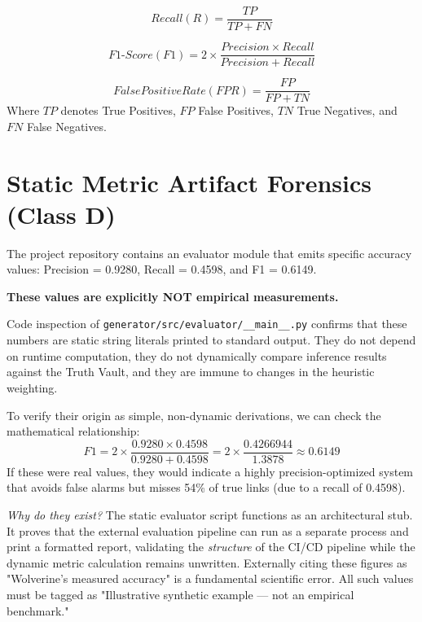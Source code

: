 \begin{equation}
\label{eq:recall}
Recall (R) = \frac{TP}{TP + FN}
\end{equation}

\begin{equation}
\label{eq:f1}
F1\text{-}Score (F1) = 2 \times \frac{Precision \times Recall}{Precision + Recall}
\end{equation}

\begin{equation}
\label{eq:fpr}
False Positive Rate (FPR) = \frac{FP}{FP + TN}
\end{equation}
Where $TP$ denotes True Positives, $FP$ False Positives, $TN$ True Negatives, and $FN$ False Negatives.

\section{Static Metric Artifact Forensics (Class D)}
\label{sec:eval-forensics}
The project repository contains an evaluator module that emits specific accuracy values: Precision = 0.9280, Recall = 0.4598, and F1 = 0.6149.

\textbf{These values are explicitly NOT empirical measurements.}

Code inspection of \texttt{generator/src/evaluator/\_\_main\_\_.py} confirms that these numbers are static string literals printed to standard output. They do not depend on runtime computation, they do not dynamically compare inference results against the Truth Vault, and they are immune to changes in the heuristic weighting. 

To verify their origin as simple, non-dynamic derivations, we can check the mathematical relationship:
\begin{equation}
F1 = 2 \times \frac{0.9280 \times 0.4598}{0.9280 + 0.4598} = 2 \times \frac{0.4266944}{1.3878} \approx 0.6149
\end{equation}
If these were real values, they would indicate a highly precision-optimized system that avoids false alarms but misses 54\% of true links (due to a recall of 0.4598). 

\textit{Why do they exist?} The static evaluator script functions as an architectural stub. It proves that the external evaluation pipeline can run as a separate process and print a formatted report, validating the \textit{structure} of the CI/CD pipeline while the dynamic metric calculation remains unwritten. Externally citing these figures as "Wolverine's measured accuracy" is a fundamental scientific error. All such values must be tagged as "Illustrative synthetic example — not an empirical benchmark."


